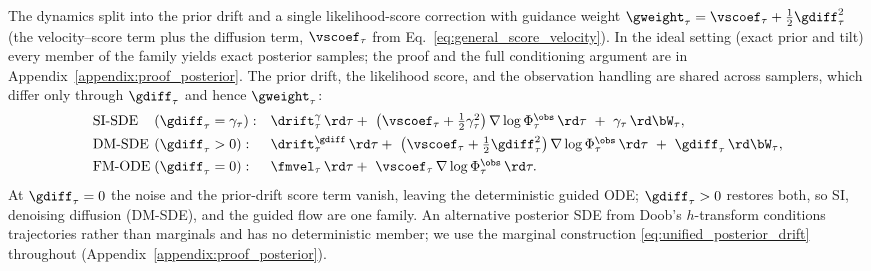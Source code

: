The dynamics split into the prior drift and a single likelihood-score correction with guidance weight $\gweight_\tau=\vscoef_\tau+\tfrac12\gdiff_\tau^2$ (the velocity--score term plus the diffusion term, $\vscoef_\tau$ from Eq.~\eqref{eq:general_score_velocity}). In the ideal setting (exact prior and tilt) every member of the family yields exact posterior samples; the proof and the full conditioning argument are in Appendix~\ref{appendix:proof_posterior}. The prior drift, the likelihood score, and the observation handling are shared across samplers, which differ only through $\gdiff_\tau$ and hence $\gweight_\tau$:
\begin{align}\label{eq:three_drifts}
\begin{array}{l@{\;}l@{\quad}l}
\text{SI-SDE} &(\gdiff_\tau=\gamma_\tau): &
  \drift^{\gamma}_\tau\,\rd\tau
  +\ \big(\vscoef_\tau+\tfrac12\gamma_\tau^2\big)\,\nabla\log\Phi_\tau^{\obs}\,\rd\tau\ +\ \gamma_\tau\,\rd\bW_\tau, \\[4pt]
\text{DM-SDE} &(\gdiff_\tau>0): &
  \drift^{\gdiff}_\tau\,\rd\tau
  +\ \big(\vscoef_\tau+\tfrac12\gdiff_\tau^2\big)\,\nabla\log\Phi_\tau^{\obs}\,\rd\tau\ +\ \gdiff_\tau\,\rd\bW_\tau, \\[4pt]
\text{FM-ODE} &(\gdiff_\tau=0): &
  \fmvel_\tau\,\rd\tau
  +\ \vscoef_\tau\,\nabla\log\Phi_\tau^{\obs}\,\rd\tau .
\end{array}
\end{align}
At $\gdiff_\tau=0$ the noise and the prior-drift score term vanish, leaving the deterministic guided ODE; $\gdiff_\tau>0$ restores both, so SI, denoising diffusion (DM-SDE), and the guided flow are one family. An alternative posterior SDE from Doob's $h$-transform conditions trajectories rather than marginals and has no deterministic member; we use the marginal construction \eqref{eq:unified_posterior_drift} throughout (Appendix~\ref{appendix:proof_posterior}).







